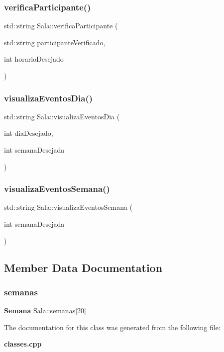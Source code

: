 \subsubsection{verifica\+Participante()}
{\footnotesize\ttfamily std\+::string Sala\+::verifica\+Participante (\begin{DoxyParamCaption}\item[{std\+::string}]{participante\+Verificado,  }\item[{int}]{horario\+Desejado }\end{DoxyParamCaption})\hspace{0.3cm}{\ttfamily [inline]}}

\mbox{\label{class_sala_a86fbf3badccd0f20983b245923712da7}} 
\subsubsection{visualiza\+Eventos\+Dia()}
{\footnotesize\ttfamily std\+::string Sala\+::visualiza\+Eventos\+Dia (\begin{DoxyParamCaption}\item[{int}]{dia\+Desejado,  }\item[{int}]{semana\+Desejada }\end{DoxyParamCaption})\hspace{0.3cm}{\ttfamily [inline]}}

\mbox{\label{class_sala_a9d925527b50c774d7072fbbc5a089582}} 
\subsubsection{visualiza\+Eventos\+Semana()}
{\footnotesize\ttfamily std\+::string Sala\+::visualiza\+Eventos\+Semana (\begin{DoxyParamCaption}\item[{int}]{semana\+Desejada }\end{DoxyParamCaption})\hspace{0.3cm}{\ttfamily [inline]}}



\subsection{Member Data Documentation}
\mbox{\label{class_sala_a1644c1c862274e57d712787cf62ff766}} 
\subsubsection{semanas}
{\footnotesize\ttfamily \textbf{ Semana} Sala\+::semanas[20]}



The documentation for this class was generated from the following file\+:\begin{DoxyCompactItemize}
\item 
\textbf{ classes.\+cpp}\end{DoxyCompactItemize}
